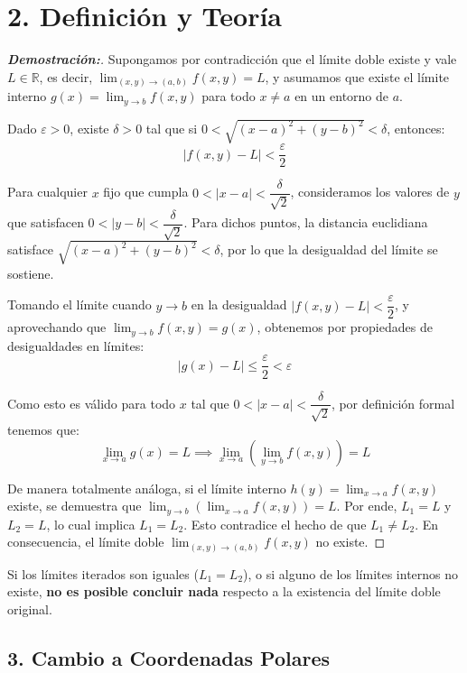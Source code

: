 \documentclass[11pt]{article}
\newenvironment{teoria}{%
  \section*{2. Definición y Teoría}%
}{}
\newenvironment{alerta}[1]{%
  \begin{tcolorbox}[colback=yellow!10,colframe=orange!80!black,title=Alerta: #1]%
}{%
  \end{tcolorbox}%
}
\begin{document}
\begin{teoria}
  \begin{proof}[\textbf{Demostración:}]
    Supongamos por contradicción que el límite doble existe y vale $L \in \mathbb{R}$, es decir, $\displaystyle\lim_{(x,y) \to (a,b)} f(x,y) = L$, y asumamos que existe el límite interno $g(x) = \displaystyle\lim_{y \to b} f(x,y)$ para todo $x \neq a$ en un entorno de $a$.

    Dado $\varepsilon > 0$, existe $\delta > 0$ tal que si $0 < \sqrt{(x-a)^2 + (y-b)^2} < \delta$, entonces:
    $$ |f(x,y) - L| < \dfrac{\varepsilon}{2} $$

    Para cualquier $x$ fijo que cumpla $0 < |x - a| < \dfrac{\delta}{\sqrt{2}}$, consideramos los valores de $y$ que satisfacen $0 < |y - b| < \dfrac{\delta}{\sqrt{2}}$. Para dichos puntos, la distancia euclidiana satisface $\sqrt{(x-a)^2 + (y-b)^2} < \delta$, por lo que la desigualdad del límite se sostiene.

    Tomando el límite cuando $y \to b$ en la desigualdad $|f(x,y) - L| < \dfrac{\varepsilon}{2}$, y aprovechando que $\displaystyle\lim_{y \to b} f(x,y) = g(x)$, obtenemos por propiedades de desigualdades en límites:
    $$ |g(x) - L| \leq \dfrac{\varepsilon}{2} < \varepsilon $$

    Como esto es válido para todo $x$ tal que $0 < |x - a| < \dfrac{\delta}{\sqrt{2}}$, por definición formal tenemos que:
    $$ \displaystyle\lim_{x \to a} g(x) = L \implies \displaystyle\lim_{x \to a} \left( \displaystyle\lim_{y \to b} f(x,y) \right) = L $$

    De manera totalmente análoga, si el límite interno $h(y) = \displaystyle\lim_{x \to a} f(x,y)$ existe, se demuestra que $\displaystyle\lim_{y \to b} \left( \displaystyle\lim_{x \to a} f(x,y) \right) = L$.
    Por ende, $L_1 = L$ y $L_2 = L$, lo cual implica $L_1 = L_2$. Esto contradice el hecho de que $L_1 \neq L_2$.
    En consecuencia, el límite doble $\displaystyle\lim_{(x,y) \to (a,b)} f(x,y)$ no existe.
  \end{proof}

  \begin{alerta}{Observación sobre Iterados}
    Si los límites iterados son iguales ($L_1 = L_2$), o si alguno de los límites internos no existe, \textbf{no es posible concluir nada} respecto a la existencia del límite doble original.
  \end{alerta}

  \subsection*{3. Cambio a Coordenadas Polares}


\end{teoria}
\end{document}
